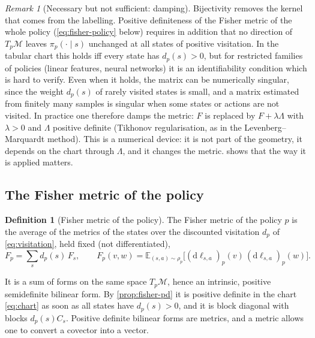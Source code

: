 \documentclass[11pt,a4paper]{article}
\numberwithin{equation}{section}
\theoremstyle{plain}
\theoremstyle{definition}
\newtheorem{definition}[theorem]{Definition}
\theoremstyle{remark}
\newtheorem{remark}[theorem]{Remark}
\newcommand{\E}{\mathbb{E}}
\newcommand{\dd}{\mathrm{d}}
\newcommand{\mani}{\mathcal{M}}
\begin{document}
\begin{remark}[Necessary but not sufficient: damping]\label{rem:damping}
Bijectivity removes the kernel that comes from the labelling. Positive definiteness of the Fisher metric of the whole policy (\eqref{eq:fisher-policy} below) requires in
addition that no direction of $T_p\mani$ leaves $\pi_p(\cdot\mid s)$ unchanged at all states of positive visitation. In the tabular chart this holds iff every state has
$d_p(s)>0$, but for restricted families of policies (linear features, neural networks) it is an identifiability condition which is hard to verify. Even when it holds, the matrix can be
numerically singular, since the weight $d_p(s)$ of rarely visited states is small, and a matrix estimated from finitely many samples is singular when some states or actions are not
visited. In practice one therefore damps the metric: $F$ is replaced by $F+\lambda\Lambda$ with $\lambda>0$ and $\Lambda$ positive definite (Tikhonov regularisation, as in the
Levenberg--Marquardt method). This is a numerical device: it is not part of the geometry, it depends on the chart through $\Lambda$, and it changes the metric.
 shows that the way it is applied matters.
\end{remark}

\subsection{The Fisher metric of the policy}

\begin{definition}[Fisher metric of the policy]\label{def:fisher-policy}
The Fisher metric of the policy $p$ is the average of the metrics of the states over the discounted visitation $d_p$ of \eqref{eq:visitation}, held fixed (not differentiated),
\begin{equation}\label{eq:fisher-policy}
  F_p=\sum_sd_p(s)\,F_s,
  \qquad
  F_p(v,w)=\E_{(s,a)\sim\rho_p}\bigl[(\dd\ell_{s,a})_p(v)\,(\dd\ell_{s,a})_p(w)\bigr].
\end{equation}
\end{definition}

It is a sum of forms on the same space $T_p\mani$, hence an intrinsic, positive semidefinite bilinear form. By \cref{prop:fisher-pd} it is positive definite in the chart
\eqref{eq:chart} as soon as all states have $d_p(s)>0$, and it is block diagonal with blocks $d_p(s)C_s$. Positive definite bilinear forms are metrics, and a metric allows one to convert a
covector into a vector.
\end{document}
